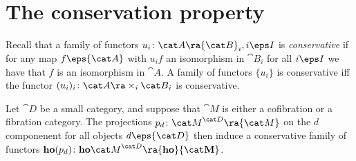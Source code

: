 \section{The conservation property}
\label{sec:conservationproperty}

Recall that a family of functors $u_i \colon {\cat A} \ra {\cat B}_i, i \eps I$ is {\it conservative} if for any map $f \eps {\cat A}$ with $u_if$ an isomorphism in ${\cat B}_i$ for all $i \eps I$ we have that $f$ is an isomorphism in ${\cat A}$. A family of functors $\{ u_i\}$ is conservative iff the functor $(u_i)_i \colon {\cat A} \ra \times_i {\cat B}_i$ is conservative.

\begin{thm}
\label{thm:homotcatconservative}
Let ${\cat D}$ be a small category, and suppose that ${\cat M}$ is either a cofibration or a fibration category. The projections $p_d \colon {\cat M}^{\cat D} \ra {\cat M} $ on the $d$ componenent for all objects $d \eps {\cat D}$ then induce a conservative family of functors ${\bf ho}(p_d) \colon {\bf ho}{\cat M}^{\cat D} \ra {\bf ho}{\cat M}$.
\end{thm}

